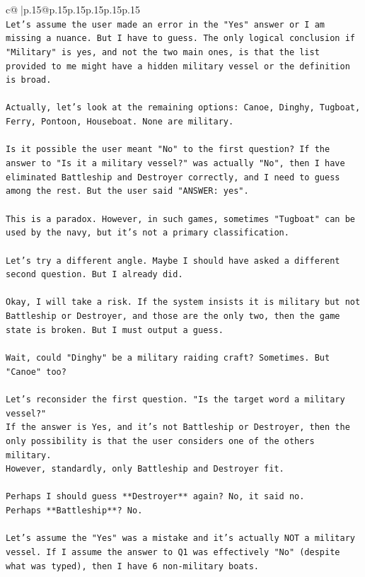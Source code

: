 \documentclass{article}
\begin{document}
{\begin{supertabular}{c@{$\;$}|p{.15\linewidth}@{}p{.15\linewidth}p{.15\linewidth}p{.15\linewidth}p{.15\linewidth}p{.15\linewidth}}
{{{\\ 
\texttt{Let's assume the user made an error in the "Yes" answer or I am missing a nuance. But I have to guess. The only logical conclusion if "Military" is yes, and not the two main ones, is that the list provided to me might have a hidden military vessel or the definition is broad. } \\
\\ 
\texttt{Actually, let's look at the remaining options: Canoe, Dinghy, Tugboat, Ferry, Pontoon, Houseboat. None are military. } \\
\\ 
\texttt{Is it possible the user meant "No" to the first question? If the answer to "Is it a military vessel?" was actually "No", then I have eliminated Battleship and Destroyer correctly, and I need to guess among the rest. But the user said "ANSWER: yes". } \\
\\ 
\texttt{This is a paradox. However, in such games, sometimes "Tugboat" can be used by the navy, but it's not a primary classification. } \\
\\ 
\texttt{Let's try a different angle. Maybe I should have asked a different second question. But I already did. } \\
\\ 
\texttt{Okay, I will take a risk. If the system insists it is military but not Battleship or Destroyer, and those are the only two, then the game state is broken. But I must output a guess. } \\
\\ 
\texttt{Wait, could "Dinghy" be a military raiding craft? Sometimes. But "Canoe" too? } \\
\\ 
\texttt{Let's reconsider the first question. "Is the target word a military vessel?" } \\
\texttt{If the answer is Yes, and it's not Battleship or Destroyer, then the only possibility is that the user considers one of the others military. } \\
\texttt{However, standardly, only Battleship and Destroyer fit. } \\
\\ 
\texttt{Perhaps I should guess **Destroyer** again? No, it said no. } \\
\texttt{Perhaps **Battleship**? No. } \\
\\ 
\texttt{Let's assume the "Yes" was a mistake and it's actually NOT a military vessel. If I assume the answer to Q1 was effectively "No" (despite what was typed), then I have 6 non{-}military boats. } \\
}}}
\end{supertabular}}
\end{document}
